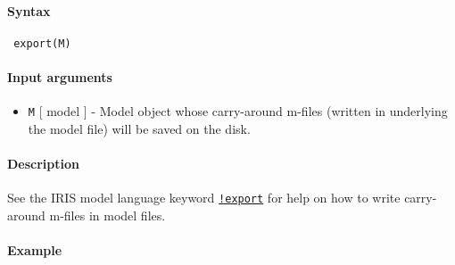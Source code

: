 


	\paragraph{Syntax}
 
 \begin{verbatim}
 export(M)
 \end{verbatim}
 
 \paragraph{Input arguments}
 
 \begin{itemize}
 \item
   \texttt{M} {[} model {]} - Model object whose carry-around m-files
   (written in underlying the model file) will be saved on the disk.
 \end{itemize}
 
 \paragraph{Description}
 
 See the IRIS model language keyword
 \href{modellang/export}{\texttt{!export}} for help on how to write
 carry-around m-files in model files.
 
 \paragraph{Example}


